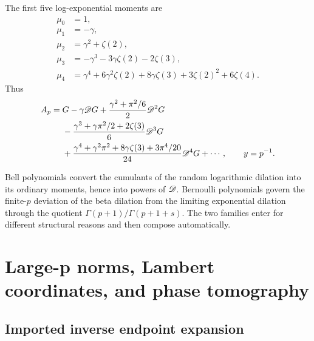 \documentclass[11pt,oneside]{article}
\theoremstyle{definition}
\theoremstyle{remark}
\begin{document}
The first five log-exponential moments are
\begin{align}
 \mu_0&=1,\nonumber\\
 \mu_1&=-\gamma,\nonumber\\
 \mu_2&=\gamma^2+\zeta(2),\nonumber\\
 \mu_3&=-\gamma^3-3\gamma\zeta(2)-2\zeta(3),\nonumber\\
 \mu_4&=\gamma^4+6\gamma^2\zeta(2)+8\gamma\zeta(3)
       +3\zeta(2)^2+6\zeta(4).
 \label{p4:eq:first-mu}
\end{align}
Thus
\begin{align}
 A_p={}&G-\gamma\mathscr D G
 +\frac{\gamma^2+\pi^2/6}{2}\mathscr D^2G\nonumber\\
 &-\frac{\gamma^3+\gamma\pi^2/2+2\zeta(3)}{6}\mathscr D^3G\nonumber\\
 &+\frac{\gamma^4+\gamma^2\pi^2+8\gamma\zeta(3)+3\pi^4/20}{24}\mathscr D^4G
 +\cdots,
 \qquad y=p^{-1}.
 \label{p4:eq:Gamma-operator-first-terms}
\end{align}

\begin{remark}
Bell polynomials convert the cumulants of the random logarithmic dilation into its ordinary
moments, hence into powers of $\mathscr D$.  Bernoulli polynomials govern the finite-$p$ deviation
of the beta dilation from the limiting exponential dilation through the quotient
$\Gamma(p+1)/\Gamma(p+1+s)$.  The two families enter for different structural reasons and
then compose automatically.
\end{remark}

\section{Large-p norms, Lambert coordinates, and phase tomography}
\label{p4:sec:large-p}

\subsection{Imported inverse endpoint expansion}
\end{document}
